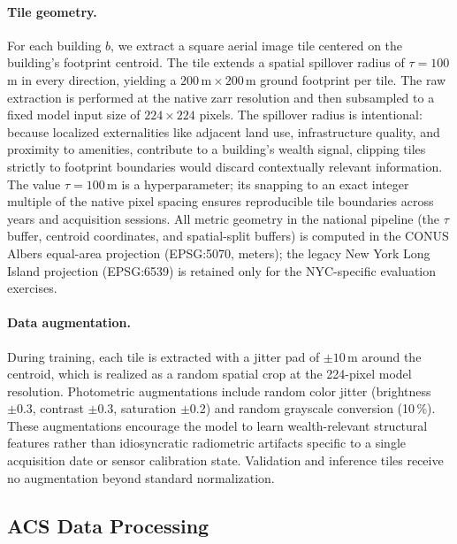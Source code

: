 \documentclass[conference]{IEEEtran}
\begin{document}
\paragraph{Tile geometry.}
For each building $b$, we extract a square aerial image tile centered on the building's footprint centroid. The tile extends a spatial spillover radius of $\tau = 100$\,m in every direction, yielding a $200\,\mathrm{m} \times 200\,\mathrm{m}$ ground footprint per tile. The raw extraction is performed at the native zarr resolution and then subsampled to a fixed model input size of $224 \times 224$ pixels. The spillover radius is intentional: because localized externalities like adjacent land use, infrastructure quality, and proximity to amenities, contribute to a building's wealth signal, clipping tiles strictly to footprint boundaries would discard contextually relevant information. The value $\tau = 100$\,m is a hyperparameter; its snapping to an exact integer multiple of the native pixel spacing ensures reproducible tile boundaries across years and acquisition sessions. All metric geometry in the national pipeline (the $\tau$ buffer, centroid coordinates, and spatial-split buffers) is computed in the CONUS Albers equal-area projection (EPSG:5070, meters); the legacy New York Long Island projection (EPSG:6539) is retained only for the NYC-specific evaluation exercises.

\paragraph{Data augmentation.}
During training, each tile is extracted with a jitter pad of $\pm 10$\,m around the centroid, which is realized as a random spatial crop at the 224-pixel model resolution. Photometric augmentations include random color jitter (brightness $\pm 0.3$, contrast $\pm 0.3$, saturation $\pm 0.2$) and random grayscale conversion (10\,\%). These augmentations encourage the model to learn wealth-relevant structural features rather than idiosyncratic radiometric artifacts specific to a single acquisition date or sensor calibration state. Validation and inference tiles receive no augmentation beyond standard normalization.

\subsection{ACS Data Processing}
\label{sec:acs}
\end{document}
